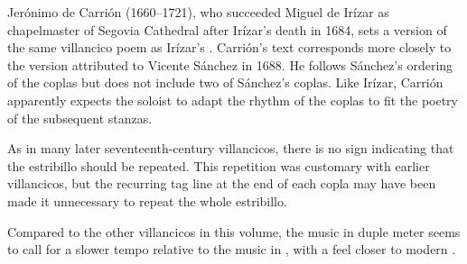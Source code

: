 
\begin{notesources}
    \begin{source}
    \end{source}
\end{notesources}

Jerónimo de Carrión (1660--1721), who succeeded Miguel de Irízar as 
chapelmaster of Segovia Cathedral after Irízar's death in 1684, sets a version 
of the same villancico poem as Irízar's .%
    \Autocites[70--84, 331--336]{Cashner:PhD}
    {LopezCalo:Segovia}
Carrión's text corresponds more closely to the version attributed to Vicente 
Sánchez in 1688.
He follows Sánchez's ordering of the coplas but does not include two of 
Sánchez's coplas.
Like Irízar, Carrión apparently expects the soloist to adapt the rhythm of the 
coplas to fit the poetry of the subsequent stanzas.

As in many later seventeenth-century villancicos, there is no sign indicating
that the estribillo should be repeated.
This repetition was customary with earlier villancicos, but the recurring tag 
line at the end of each copla may have been made it unnecessary to repeat the 
whole estribillo.%
    \Autocite{Torrente:Estribillo}

Compared to the other villancicos in this volume, the music in duple meter seems
to call for a slower tempo relative to the music in \meterCThree, with a feel closer to
modern .
